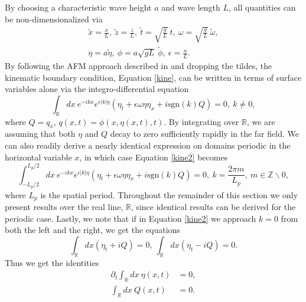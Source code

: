 \documentclass[a4paper,11pt]{article}
\newcommand{\pd}{\partial}
\begin{document}
By choosing a characteristic wave height $a$ and wave length $L$, all quantities can be non-dimensionalized via
\begin{align*}
\tilde{x} = \frac{x}{L}, ~\tilde{z} = \frac{z}{L}, ~ \tilde{t} = \sqrt{\frac{g}{L}}~t, ~\omega = \sqrt{\frac{g}{L}}~\tilde{\omega}, \\
\eta = a \tilde{\eta}, ~ \phi  = a\sqrt{gL}~\tilde{\phi} , ~ \epsilon = \frac{a}{L}.
\end{align*}
By following the AFM approach described in \cite{afm,ashton} and dropping the tildes, the kinematic boundary condition, Equation \eqref{kine}, can be written in terms of surface variables alone via the integro-differential equation
\begin{equation}
\int_{\mathbb{R}}dx~e^{-ikx}e^{\epsilon|k|\eta}\left(\eta_{t} +
  \epsilon \omega \eta \eta_{x} + i \mbox{sgn}(k)Q \right) = 0, ~
k\neq 0,
\label{kine2}
\end{equation}
where $Q=q_{x}$, $q(x,t) = \phi(x,\eta(x,t),t)$.  By integrating over $\mathbb{R}$, we are assuming that both $\eta$ and $Q$ decay to zero sufficiently rapidly in the far field.  We can also readily derive a nearly identical expression on domains periodic in the horizontal variable $x$, in which case Equation \eqref{kine2} becomes
\begin{equation}
\int_{-L_{p}/2}^{L_{p}/2}dx~e^{-ikx}e^{\epsilon|k|\eta}\left(\eta_{t} +
  \epsilon \omega \eta \eta_{x} + i \mbox{sgn}(k)Q \right) = 0, ~ k = \frac{2\pi m}{L_{p}}, ~ m\in \mathbb{Z}\backslash{0},
\label{integro1per}
\end{equation}
where $L_p$ is the spatial period.  Throughout the remainder of this section we only present results over the real line, $\mathbb{R}$, since identical results can be derived for the periodic case.
Lastly, we note that if in Equation \eqref{kine2} we approach $k=0$ from both the left and the right, we get the equations
\[
\int_{\mathbb{R}}dx \left(\eta_{t} + i Q \right) = 0, ~ \int_{\mathbb{R}}dx \left(\eta_{t} - i Q \right) = 0.
\]
Thus we get the identities
\begin{align}
\pd_{t}\int_{\mathbb{R}} dx ~\eta(x,t) & = 0, \label{zavsurf}\\
\int_{\mathbb{R}} dx ~Q(x,t) & = 0. \label{zavpot}
\end{align}
\end{document}
